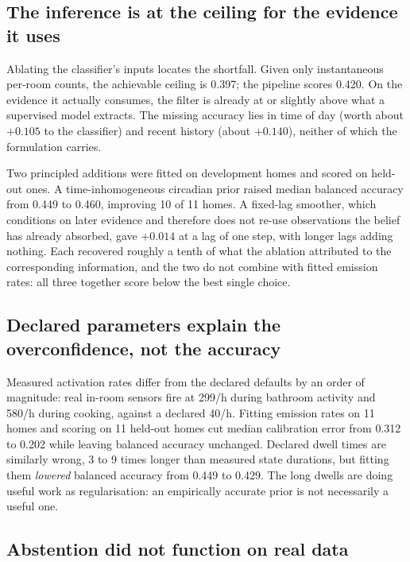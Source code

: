 \documentclass[11pt]{article}
\begin{document}
\subsection{The inference is at the ceiling for the evidence it uses}

Ablating the classifier's inputs locates the shortfall. Given only instantaneous
per-room counts, the achievable ceiling is 0.397; the pipeline scores 0.420.
On the evidence it actually consumes, the filter is already at or slightly above
what a supervised model extracts. The missing accuracy lies in time of day
(worth about $+0.105$ to the classifier) and recent history (about $+0.140$),
neither of which the formulation carries.

Two principled additions were fitted on development homes and scored on held-out
ones. A time-inhomogeneous circadian prior raised median balanced accuracy from
0.449 to 0.460, improving 10 of 11 homes. A fixed-lag smoother, which conditions
on later evidence and therefore does not re-use observations the belief has
already absorbed, gave $+0.014$ at a lag of one step, with longer lags adding
nothing. Each recovered roughly a tenth of what the ablation attributed to the
corresponding information, and the two do not combine with fitted emission rates:
all three together score below the best single choice.

\subsection{Declared parameters explain the overconfidence, not the accuracy}

Measured activation rates differ from the declared defaults by an order of
magnitude: real in-room sensors fire at 299/h during bathroom activity and 580/h
during cooking, against a declared 40/h. Fitting emission rates on 11 homes and
scoring on 11 held-out homes cut median calibration error from 0.312 to 0.202
while leaving balanced accuracy unchanged. Declared dwell times are similarly
wrong, 3 to 9 times longer than measured state durations, but fitting them
\emph{lowered} balanced accuracy from 0.449 to 0.429. The long dwells are doing
useful work as regularisation: an empirically accurate prior is not necessarily
a useful one.

\subsection{Abstention did not function on real data}
\label{sec:abstentionfailure}
\end{document}
